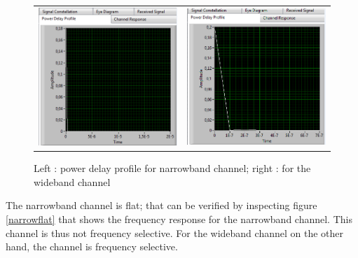 \documentclass{article}
\begin{document}
    
\begin{figure}[h!]
    \centering
    \begin{tabular}{c c}
     \includegraphics[width = 0.4 \textwidth ]{narrowT} & \includegraphics[width = 0.4 \textwidth]{wideT} \\
    \end{tabular}
    \caption{Left : power delay profile for narrowband channel; right : for the wideband channel}
    \label{effL}
\end{figure}
    
The narrowband channel is flat; that can be verified by inspecting figure \ref{narrowflat} that shows the frequency response for the narrowband channel. This channel is thus not frequency selective. For the wideband channel on the other hand, the channel is frequency selective.
\end{document}
